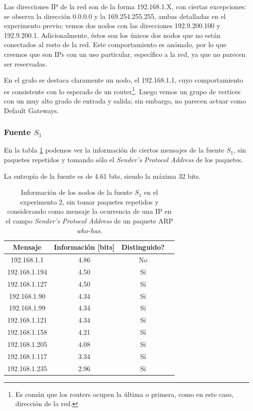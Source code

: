 \par Las direcciones IP de la red son de la forma 192.168.1.X, con ciertas excepciones: se observa la dirección 0.0.0.0 y la 169.254.255.255, ambas detalladas en el experimento previo; vemos dos nodos con las direcciones 192.9.200.100 y 192.9.200.1.
Adicionalmente, éstos son los únicos dos nodos que no están conectados al resto de la red.
Este comportamiento es anómalo, por lo que creemos que son IPs con un uso particular, específico a la red, ya que no parecen ser reservadas.

\par En el grafo se destaca claramente un nodo, el 192.168.1.1, cuyo comportamiento es consistente con lo esperado de un router\footnote{Es común que los routers ocupen la última o primera, como en este caso, dirección de la red.}.
Luego vemos un grupo de vertices con un muy alto grado de entrada y salida; sin embargo, no parecen actuar como Default Gateways.

\subsubsection{Fuente $S_1$}

\par En la tabla \ref{tab2SinRSinA} podemos ver la información de ciertos mensajes de la fuente $S_1$, sin paquetes repetidos y tomando sólo el \textit{Sender's Protocol Address} de los paquetes.

\par La entropía de la fuente es de 4.61 bits, siendo la máxima 32 bits. 

\begin{table}[t]
    \centering
    \begin{tabular}{ | c | c | c | l |}
        \hline
        Mensaje & Información [bits] & Distinguido?\\
        \hline
192.168.1.1 & 4.86 & No \\
\hline
192.168.1.194 & 4.50 & Sí \\
\hline
192.168.1.127 & 4.50 & Sí \\
\hline
192.168.1.90 & 4.34 & Sí \\
\hline
192.168.1.99 & 4.34 & Sí \\
\hline
192.168.1.121 & 4.34 & Sí \\
\hline
192.168.1.158 & 4.21 & Sí \\
\hline
192.168.1.205 & 4.08 & Sí \\
\hline
192.168.1.117 & 3.34 & Sí \\
\hline
192.168.1.235 & 2.96 & Sí \\
\hline
    \end{tabular} 
    \caption{Información de los nodos de la fuente $S_1$ en el experimento 2, sin tomar paquetes repetidos y considerando como mensaje la ocurrencia de una IP en el campo \textit{Sender's Protocol Address} de un paquete ARP \textit{who-has}.}
    \label{tab2SinRSinA}
\end{table} 

